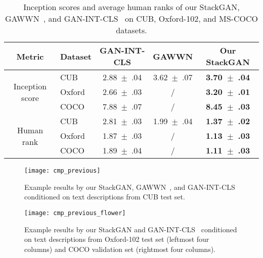 \documentclass[10pt,twocolumn,letterpaper]{article}
\begin{document}
\begin{table}[bt]
\begin{center}
\scriptsize
\begin{tabular}{|c|l|c|c|c|}
\hline
    Metric &Dataset &GAN-INT-CLS &GAWWN &Our StackGAN\\
\hline
\multirow{3}{3.2em}{Inception score}  &CUB    &2.88~$\pm$~.04 &3.62~$\pm$~.07 &{\bf 3.70~$\pm$~.04}   \\
\cline{2-5}
    &Oxford &2.66~$\pm$~.03 &/              &{\bf 3.20~$\pm$~.01}  \\
\cline{2-5}
    &COCO   &7.88~$\pm$~.07 &/              &{\bf 8.45~$\pm$~.03}  \\
\hline
\multirow{3}{3.2em}{Human rank}  &CUB    &2.81~$\pm$~.03 &1.99~$\pm$~.04  &{\bf 1.37~$\pm$~.02}  \\
\cline{2-5}
    &Oxford &1.87~$\pm$~.03 &/               &{\bf 1.13~$\pm$~.03}   \\
\cline{2-5}
    &COCO   &1.89~$\pm$~.04 &/               &{\bf 1.11~$\pm$~.03}  \\
\hline
\end{tabular}
\end{center}
\vspace{-5pt}
    \caption{Inception scores and average human ranks of our StackGAN, GAWWN~\cite{reed2016learning}, and GAN-INT-CLS~\cite{reed2016generative} on CUB, Oxford-102, and MS-COCO datasets.}
\vspace{-15pt}
\label{tab:cmp_previous}
\end{table}


\begin{figure*}[tb]
\begin{center}
\texttt{[image: cmp\_previous]}
\end{center}
\vspace{-8pt}
    \caption{Example results by our StackGAN, GAWWN~\cite{reed2016learning}, and GAN-INT-CLS~\cite{reed2016generative} conditioned on text descriptions from CUB test set.}
\vspace{-2pt}
\label{fig:cmp_previous}
\end{figure*}




\begin{figure*}[tb]
\begin{center}
\texttt{[image: cmp\_previous\_flower]}
\end{center}
\vspace{-8pt}
    \caption{Example results by our StackGAN and GAN-INT-CLS~\cite{reed2016generative} conditioned on text descriptions from Oxford-102 test set (leftmost four columns) and COCO validation set (rightmost four columns).}
 \vspace{-8pt}
\label{fig:cmp_previous_flower}
\end{figure*}
\end{document}
